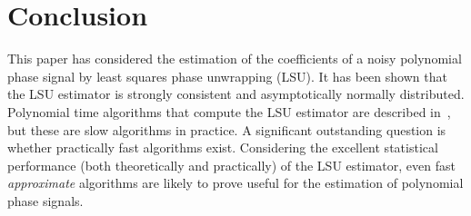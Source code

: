 \documentclass[aap]{imsart}
\begin{document}



\section{Conclusion} \label{sec:conclusion}
 
This paper has considered the estimation of the coefficients of a noisy polynomial phase signal by least squares phase unwrapping (LSU). It has been shown that the LSU estimator is strongly consistent and asymptotically normally distributed. %
Polynomial time algorithms that compute the LSU estimator are described in~\cite{McKilliam2010thesis}, but these are slow algorithms in practice.  A significant outstanding question is whether practically fast algorithms exist.  Considering the excellent statistical performance (both theoretically and practically) of the LSU estimator, even fast \emph{approximate} algorithms are likely to prove useful for the estimation of polynomial phase signals. 
  
\end{document}
